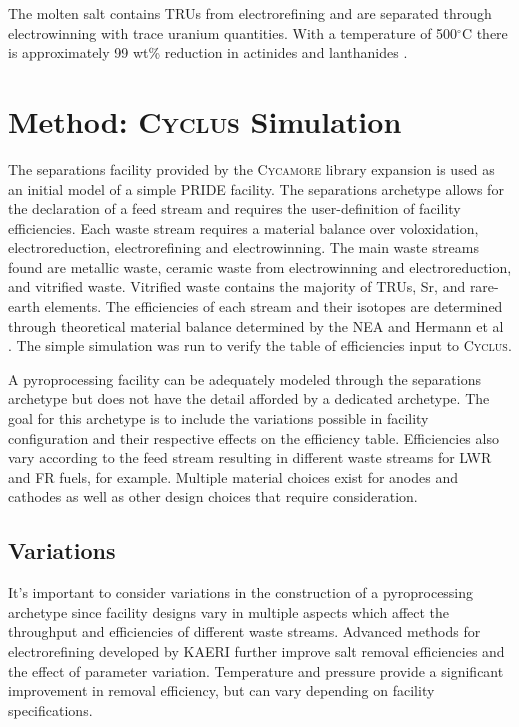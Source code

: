 \documentclass{anstrans}
\newcommand{\Cyclus}{\textsc{Cyclus}\xspace}%
\newcommand{\Cycamore}{\textsc{Cycamore}\xspace}%
\begin{document}
The molten salt contains TRUs from electrorefining and are separated through electrowinning with trace uranium quantities. 
With a temperature of 500$^{\circ}$C there is approximately 99 wt\% reduction in actinides and lanthanides \cite{flowsheet_1998}. 
\section{Method: \Cyclus Simulation}
The separations facility provided by the \Cycamore library expansion is used as 
an initial model of a simple \gls{PRIDE} facility. 
The separations archetype allows for the declaration of a feed stream and requires the user-definition of facility efficiencies. 
Each waste stream requires a material balance over voloxidation, electroreduction, electrorefining and electrowinning. The main 
waste streams found are metallic waste, ceramic waste from electrowinning and electroreduction, and vitrified waste. Vitrified 
waste contains the majority of TRUs, Sr, and rare-earth elements. The efficiencies of each stream and their isotopes are 
determined through theoretical material balance determined by the NEA and Hermann et al \cite{flowsheet_1998,herrmann_separation_2010}. 
The simple simulation was run to verify the table of efficiencies input to \Cyclus.

A pyroprocessing facility can be adequately modeled through the separations archetype but does not have the detail afforded 
by a dedicated archetype. The goal for this archetype is to include the variations possible in facility configuration and 
their respective effects on the efficiency table. Efficiencies also vary according to the feed stream resulting in different 
waste streams for LWR and FR fuels, for example. Multiple material choices exist for anodes and cathodes as well as other 
design choices that require consideration. 

\subsection{Variations}
It's important to consider variations in the construction of a pyroprocessing archetype since facility designs vary in 
multiple aspects which affect the throughput and efficiencies of different waste streams. Advanced methods for electrorefining 
developed by \gls{KAERI} \cite{lee_advanced_nodate} further improve salt removal efficiencies and the effect of parameter variation. 
Temperature and pressure provide a significant improvement in removal efficiency, but can vary depending on facility specifications. 
\end{document}
